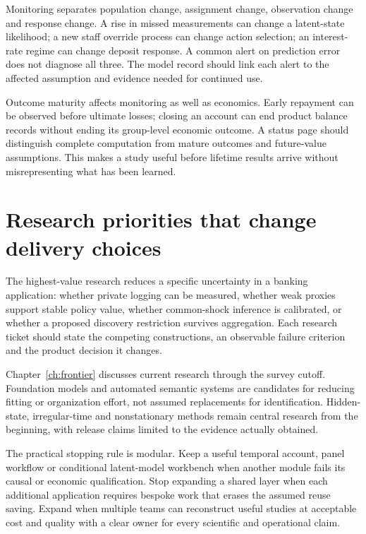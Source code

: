 Monitoring separates population change, assignment change, observation
change and response change. A rise in missed measurements can change a
latent-state likelihood; a new staff override process can change action
selection; an interest-rate regime can change deposit response. A common
alert on prediction error does not diagnose all three. The model record
should link each alert to the affected assumption and evidence needed for
continued use.

Outcome maturity affects monitoring as well as economics. Early repayment
can be observed before ultimate losses; closing an account can end product
balance records without ending its group-level economic outcome. A status
page should distinguish complete computation from mature outcomes and
future-value assumptions. This makes a study useful before lifetime results
arrive without misrepresenting what has been learned.

\section{Research priorities that change delivery choices}
The highest-value research reduces a specific uncertainty in a banking
application: whether private logging can be measured, whether weak proxies
support stable policy value, whether common-shock inference is calibrated,
or whether a proposed discovery restriction survives aggregation. Each
research ticket should state the competing constructions, an observable
failure criterion and the product decision it changes.

Chapter~\ref{ch:frontier} discusses current research through the survey
cutoff. Foundation models and automated semantic systems are candidates
for reducing fitting or organization effort, not assumed replacements
for identification. Hidden-state, irregular-time and nonstationary
methods remain central research from the beginning, with release claims
limited to the evidence actually obtained.

The practical stopping rule is modular. Keep a useful temporal account,
panel workflow or conditional latent-model workbench when another module
fails its causal or economic qualification. Stop expanding a shared layer
when each additional application requires bespoke work that erases the
assumed reuse saving. Expand when multiple teams can reconstruct useful
studies at acceptable cost and quality with a clear owner for every
scientific and operational claim.
